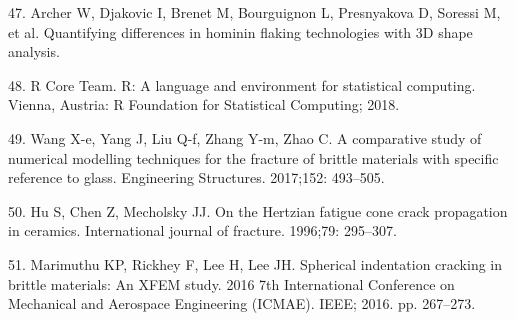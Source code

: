 \documentclass[10pt,letterpaper]{article}
\newenvironment{cslreferences}%
  {}%
  {\par}
\begin{document}
\begin{cslreferences}
\leavevmode\hypertarget{ref-archer_quantifying_nodate}{}%
47. Archer W, Djakovic I, Brenet M, Bourguignon L, Presnyakova D,
Soressi M, et al. Quantifying differences in hominin flaking
technologies with 3D shape analysis.

\leavevmode\hypertarget{ref-r_core_team_r_2018}{}%
48. R Core Team. R: A language and environment for statistical
computing. Vienna, Austria: R Foundation for Statistical Computing;
2018.

\leavevmode\hypertarget{ref-wang_comparative_2017}{}%
49. Wang X-e, Yang J, Liu Q-f, Zhang Y-m, Zhao C. A comparative study of
numerical modelling techniques for the fracture of brittle materials
with specific reference to glass. Engineering Structures. 2017;152:
493--505.

\leavevmode\hypertarget{ref-hu_hertzian_1996}{}%
50. Hu S, Chen Z, Mecholsky JJ. On the Hertzian fatigue cone crack
propagation in ceramics. International journal of fracture. 1996;79:
295--307.

\leavevmode\hypertarget{ref-marimuthu_spherical_2016}{}%
51. Marimuthu KP, Rickhey F, Lee H, Lee JH. Spherical indentation
cracking in brittle materials: An XFEM study. 2016 7th International
Conference on Mechanical and Aerospace Engineering (ICMAE). IEEE; 2016.
pp. 267--273.
\end{cslreferences}

\nolinenumbers
\end{document}
